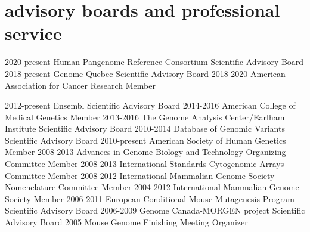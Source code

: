 \documentclass[]{dmc-cv} %
\begin{document}
\section{advisory boards and professional service}

\begin{entrylist}
\smallentry
{2020-present}
{Human Pangenome Reference Consortium}
{Scientific Advisory Board}
\smallentry
{2018-present}
{Genome Quebec}
{Scientific Advisory Board}
\smallentry
{2018-2020}
{American Association for Cancer Research}
{Member}

\smallentry
{2012-present}
{Ensembl}
{Scientific Advisory Board}
\smallentry
{2014-2016}
{American College of Medical Genetics}
{Member}
\smallentry
{2013-2016}
{The Genome Analysis Center/Earlham Institute}
{Scientific Advisory Board}
\smallentry
{2010-2014}
{Database of Genomic Variants}
{Scientific Advisory Board}
\smallentry
{2010-present}
{American Society of Human Genetics}
{Member}
\smallentry
{2008-2013}
{Advances in Genome Biology and Technology}
{Organizing Committee Member}
\smallentry
{2008-2013}
{International Standards Cytogenomic Arrays}
{Committee Member}
\smallentry
{2008-2012}
{International Mammalian Genome Society}
{Nomenclature Committee Member}
\smallentry
{2004-2012}
{International Mammalian Genome Society}
{Member}
\smallentry
{2006-2011}
{European Conditional Mouse Mutagenesis Program}
{Scientific Advisory Board}
\smallentry
{2006-2009}
{Genome Canada-MORGEN project}
{Scientific Advisory Board}
\smallentry
{2005}
{Mouse Genome Finishing Meeting}
{Organizer}
\end{entrylist}
\end{document}
